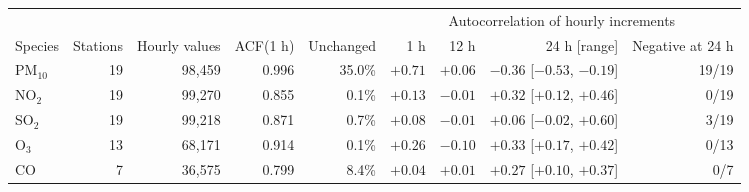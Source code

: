 \begin{tabular}{lrrrrrrrr}\toprule
& & & & & \multicolumn{4}{c}{Autocorrelation of hourly increments} \\ \cmidrule(lr){6-9}
Species & Stations & Hourly values & ACF(1 h) & Unchanged & 1 h & 12 h & 24 h [range] & Negative at 24 h \\ \midrule
PM$_{10}$ & 19 & 98{,}459 & 0.996 & 35.0\% & $+0.71$ & $+0.06$ & $-0.36$ [$-0.53$, $-0.19$] & 19/19 \\
NO$_2$ & 19 & 99{,}270 & 0.855 & 0.1\% & $+0.13$ & $-0.01$ & $+0.32$ [$+0.12$, $+0.46$] & 0/19 \\
SO$_2$ & 19 & 99{,}218 & 0.871 & 0.7\% & $+0.08$ & $-0.01$ & $+0.06$ [$-0.02$, $+0.60$] & 3/19 \\
O$_3$ & 13 & 68{,}171 & 0.914 & 0.1\% & $+0.26$ & $-0.10$ & $+0.33$ [$+0.17$, $+0.42$] & 0/13 \\
CO & 7 & 36{,}575 & 0.799 & 8.4\% & $+0.04$ & $+0.01$ & $+0.27$ [$+0.10$, $+0.37$] & 0/7 \\
\bottomrule\end{tabular}
